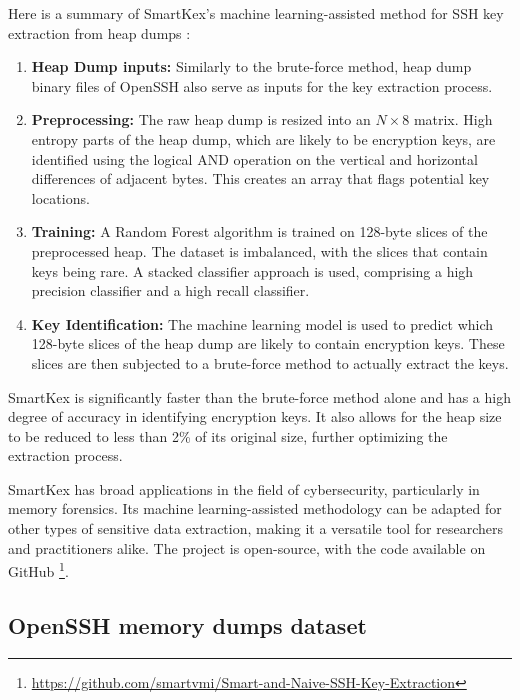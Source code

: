         Here is a summary of SmartKex's machine learning-assisted method for SSH key extraction from heap dumps \cite{SmartKex22}:

        \begin{enumerate}
            \item \textbf{Heap Dump inputs:} Similarly to the brute-force method, heap dump binary files of OpenSSH also serve as inputs for the key extraction process.
            \item \textbf{Preprocessing:} The raw heap dump is resized into an $N \times 8$ matrix. High entropy parts of the heap dump, which are likely to be encryption keys, are identified using the logical AND operation on the vertical and horizontal differences of adjacent bytes. This creates an array that flags potential key locations.
            \item \textbf{Training:} A Random Forest algorithm is trained on 128-byte slices of the preprocessed heap. The dataset is imbalanced, with the slices that contain keys being rare. A stacked classifier approach is used, comprising a high precision classifier and a high recall classifier.
            \item \textbf{Key Identification:} The machine learning model is used to predict which 128-byte slices of the heap dump are likely to contain encryption keys. These slices are then subjected to a brute-force method to actually extract the keys.
        \end{enumerate}
        
    SmartKex is significantly faster than the brute-force method alone and has a high degree of accuracy in identifying encryption keys. It also allows for the heap size to be reduced to less than 2\% of its original size, further optimizing the extraction process.

    SmartKex has broad applications in the field of cybersecurity, particularly in memory forensics. Its machine learning-assisted methodology can be adapted for other types of sensitive data extraction, making it a versatile tool for researchers and practitioners alike. The project is open-source, with the code available on GitHub \footnote{\url{https://github.com/smartvmi/Smart-and-Naive-SSH-Key-Extraction}}.

    \subsection{OpenSSH memory dumps dataset}\label{sec:background:kex:dataset}

